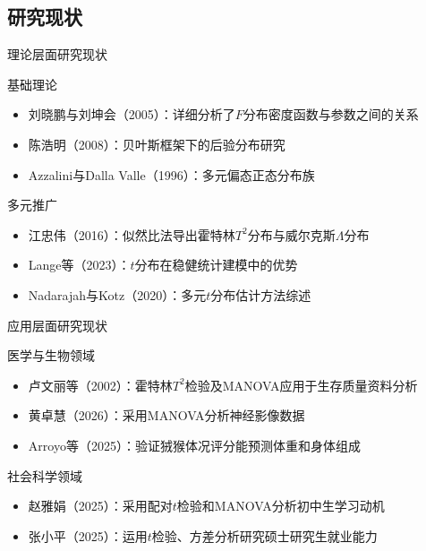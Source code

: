 \documentclass{beamer}
\begin{document}
\subsection{研究现状}
\begin{frame}{理论层面研究现状}
    \begin{block}{基础理论}
        \begin{itemize}
            \item 刘晓鹏与刘坤会（2005）：详细分析了\(F\)分布密度函数与参数之间的关系
            \item 陈浩明（2008）：贝叶斯框架下的后验分布研究
            \item Azzalini与Dalla Valle（1996）：多元偏态正态分布族
        \end{itemize}
    \end{block}

    \vspace{0.3cm}

    \begin{block}{多元推广}
        \begin{itemize}
            \item 江忠伟（2016）：似然比法导出霍特林\(T^2\)分布与威尔克斯\(\Lambda\)分布
            \item Lange等（2023）：\(t\)分布在稳健统计建模中的优势
            \item Nadarajah与Kotz（2020）：多元\(t\)分布估计方法综述
        \end{itemize}
    \end{block}
\end{frame}

\begin{frame}{应用层面研究现状}
    \begin{block}{医学与生物领域}
        \begin{itemize}
            \item 卢文丽等（2002）：霍特林\(T^2\)检验及MANOVA应用于生存质量资料分析
            \item 黄卓慧（2026）：采用MANOVA分析神经影像数据
            \item Arroyo等（2025）：验证狨猴体况评分能预测体重和身体组成
        \end{itemize}
    \end{block}

    \vspace{0.3cm}

    \begin{block}{社会科学领域}
        \begin{itemize}
            \item 赵雅娟（2025）：采用配对\(t\)检验和MANOVA分析初中生学习动机
            \item 张小平（2025）：运用\(t\)检验、方差分析研究硕士研究生就业能力
        \end{itemize}
    \end{block}
\end{frame}
\end{document}
